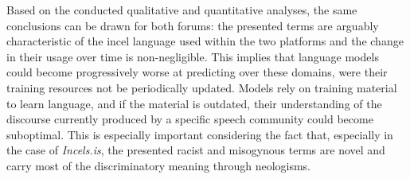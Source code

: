 \documentclass[11pt]{article}
\newcommand{\enforum}{\textit{Incels.is}}
\newcommand{\itforum}{\textit{Il forum dei brutti}}
\begin{document}


Based on the conducted qualitative and quantitative analyses, the same conclusions can be drawn for both forums: the presented terms are arguably characteristic of the incel language used within the two platforms and the change in their usage over time is non-negligible. This implies that language models could become progressively worse at predicting over these domains, were their training resources not be periodically updated. Models rely on training material to learn language, and if the material is outdated, their understanding of the discourse currently produced by a specific speech community could become suboptimal. This is especially important considering the fact that, especially in the case of \enforum, the presented racist and misogynous terms are novel and carry most of the discriminatory meaning through neologisms.
\end{document}
